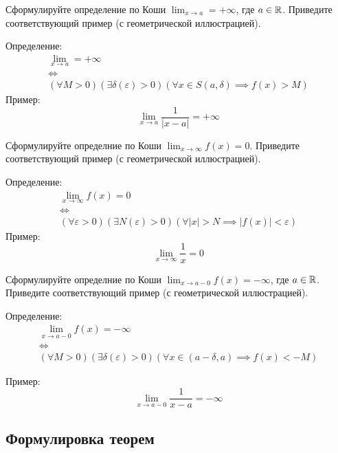 \begin{question}
  Сформулируйте определение по Коши $\lim_{x \to a} = +\infty$, где $a \in \mathbb{R}$.
Приведите соответствующий пример (с геометрической иллюстрацией).
\end{question}
\begin{answer}
  Определение:
  \begin{gather*}
    \lim_{x \to a} = +\infty \\
    \iff \\
    (\forall M > 0)(\exists \delta(\varepsilon) > 0)(\forall x \in S(a, \delta) \implies f(x) > M) 
  \end{gather*}
  Пример: \[
  \lim_{x \to a} \frac{1}{|x - a|} = +\infty
  \] 
\end{answer}

\begin{question}
  Сформулируйте определние по Коши $\lim_{x \to \infty} f(x) = 0$.
Приведите соответствующий пример (с геометрической иллюстрацией).
\end{question}
\begin{answer}
  Определение:
  \begin{gather*}
    \lim_{x \to \infty} f(x) = 0 \\
    \iff \\
    (\forall \varepsilon > 0)(\exists N(\varepsilon) > 0)(\forall |x| > N \implies |f(x)| < \varepsilon)
  \end{gather*}
  Пример: \[
    \lim_{x \to \infty} \frac{1}{x} = 0
  \] 
\end{answer}
  
\begin{question}
  Сформулируйте определние по Коши $\lim_{x \to a-0} f(x) = -\infty$, где $a \in \mathbb{R}$.
Приведите соответствующий пример (с геометрической иллюстрацией).
\end{question}
\begin{answer}
  Определение:
  \begin{gather*}
    \lim_{x \to a - 0} f(x) = -\infty \\
    \iff \\
    (\forall M > 0)(\exists \delta(\varepsilon) > 0)(\forall x \in (a - \delta, a) \implies f(x) < -M)
  \end{gather*}

  Пример: \[
    \lim_{x \to a - 0} \frac{1}{x - a} = -\infty
  \] 
\end{answer}


\subsection{Формулировка теорем}


